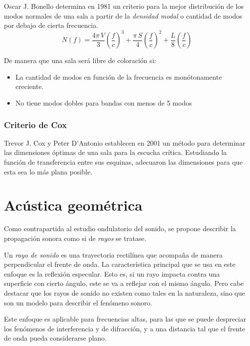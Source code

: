 \documentclass[a5paper,12pt,twoside]{book}
\begin{document}
Oscar J. Bonello determina en 1981 un criterio para la mejor distribución de los modos normales de una sala a partir de la \emph{densidad modal} o cantidad de modos por debajo de cierta frecuencia.
\begin{equation*}
    N(f) = \frac{4\pi\,V}{3} \left(\frac{f}{c}\right)^3 + \frac{\pi \, S}{4} \left(\frac{f}{c}\right)^2 + \frac{L}{8} \left(\frac{f}{c}\right)
\end{equation*}

De manera que una sala será libre de coloración si:
\begin{itemize}
    \item La cantidad de modos en función de la frecuencia es monótonamente creciente.
    \item No tiene modos dobles para bandas con menos de 5 modos
\end{itemize} 


\subsection{Criterio de Cox}

Trevor J. Cox y Peter D'Antonio establecen en 2001 un método para determinar las dimensiones óptimas de una sala para la escucha crítica.
Estudiando la función de transferencia entre sus esquinas, adecuaron las dimensiones para que esta sea lo más plana posible.


\chapter{Acústica geométrica}

Como contrapartida al estudio ondulatorio del sonido, se propone describir la propagación sonora como si de \emph{rayos} se tratase.

Un \emph{rayo de sonido} es una trayectoria rectilínea que acompaña de manera perpendicular el frente de onda.
La característica principal que se usa en este enfoque es la reflexión especular.
Esto es, si un rayo impacta contra una superficie con cierto ángulo, este se va a reflejar con el mismo ángulo.
Pero cabe destacar que los rayos de sonido no existen como tales en la naturaleza, sino que son un modelo para describir el fenómeno sonoro.

Este enfoque es aplicable para frecuencias altas, para las que se puede despreciar los fenómenos de interferencia y de difracción, y a una distancia tal que el frente de onda pueda considerarse plano.
\end{document}
